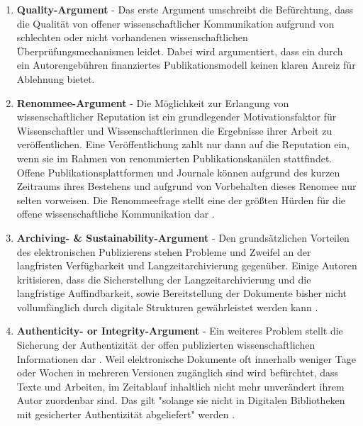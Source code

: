 \begin{enumerate}
\item \textbf{Quality-Argument} - Das erste Argument umschreibt die Befürchtung, dass die Qualität von offener wissenschaftlicher Kommunikation aufgrund von schlechten oder nicht vorhandenen wissenschaftlichen Überprüfungsmechanismen leidet. Dabei wird argumentiert, dass ein durch ein Autorengebühren finanziertes Publikationsmodell keinen klaren Anreiz für Ablehnung bietet.
\item \textbf{Renommee-Argument} - Die Möglichkeit zur Erlangung von wissenschaftlicher Reputation ist ein grundlegender Motivationsfaktor für Wissenschaftler und Wissenschaftlerinnen die Ergebnisse ihrer Arbeit zu veröffentlichen. Eine Veröffentlichung zahlt nur dann auf die Reputation ein, wenn sie im Rahmen von renommierten Publikationskanälen stattfindet. Offene Publikationsplattformen und Journale können aufgrund des kurzen Zeitraums ihres Bestehens und aufgrund von Vorbehalten dieses Renomee nur selten vorweisen. Die Renommeefrage stellt eine der größten Hürden für die offene wissenschaftliche Kommunikation dar \cite{weishaupt_2009_goldenOA}.
\item \textbf{Archiving- & Sustainability-Argument} - Den grundsätzlichen Vorteilen des elektronischen Publizierens stehen Probleme und Zweifel an der langfristen Verfügbarkeit und Langzeitarchivierung \cite{weishaupt_2009_goldenOA} gegenüber. Einige Autoren kritisieren, dass die Sicherstellung der Langzeitarchivierung und die langfristige Auffindbarkeit, sowie Bereitstellung der Dokumente bisher nicht vollumfänglich durch digitale Strukturen gewährleistet werden kann \cite{umstatter_2007_qualitatssicherung}.
\item \textbf{Authenticity- or Integrity-Argument} - Ein weiteres Problem stellt die Sicherung der Authentizität der offen publizierten wissenschaftlichen Informationen dar \cite{umstatter_2007_qualitatssicherung} \cite{weishaupt_2009_goldenOA}. Weil elektronische Dokumente oft innerhalb weniger Tage oder Wochen in mehreren Versionen zugänglich sind wird befürchtet, dass Texte und Arbeiten, im Zeitablauf inhaltlich nicht mehr unverändert ihrem Autor zuordenbar sind. Das gilt "solange sie nicht in Digitalen Bibliotheken mit gesicherter Authentizität abgeliefert" werden \cite{umstatter_2007_qualitatssicherung}.

\end{enumerate}
